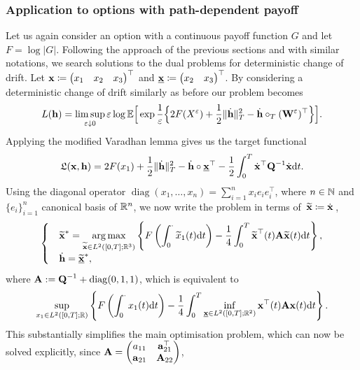 \subsubsection{\textbf{Application to options with path-dependent payoff}}
Let us again consider an option with a continuous payoff function $G$ and let $F=\log|G|$. Following the approach of the previous sections and with similar notations, we search solutions to the dual problems for deterministic change of drift.
Let 
$\boldsymbol{\mathrm{x}} \coloneqq \begin{pmatrix}x_1& x_2& x_3\end{pmatrix}^\top$ and 
$\underline{\boldsymbol{\mathrm{x}}}\coloneqq \begin{pmatrix}x_2 &  x_3\end{pmatrix}^\top$. 
By considering a deterministic change of drift similarly as before our problem becomes 
\[
L(\boldsymbol{\mathrm{h}}) = \limsup\limits_{\varepsilon \downarrow 0} \varepsilon\log\mathbb{E}\Big[\exp\frac{1}{\varepsilon}\Big\{
2F(X^\varepsilon) +\frac{1}{2}\|\dot{\boldsymbol{\mathrm{h}}}\|^2_T - \dot{\boldsymbol{\mathrm{h}}}\circ_{T}({\boldsymbol{\mathrm{W}}^\varepsilon})^\top\Big\}\Big].
\]
Applying the modified Varadhan lemma gives us the 
target functional
$$
\mathfrak{L}(\boldsymbol{\mathrm{x}},\boldsymbol{\mathrm{h}}) = 2F(x_1) + \frac{1}{2}\|\dot{\boldsymbol{\mathrm{h}}}\|^2_T - \dot{\boldsymbol{\mathrm{h}}}\circ\underline{\boldsymbol{\mathrm{x}}}^\top - \frac{1}{2}\int_0^T\dot{\boldsymbol{\mathrm{x}}}^\top \boldsymbol{\mathrm{Q}}^{-1} \dot{\boldsymbol{\mathrm{x}}} \mathrm{d} t.
$$
Using the diagonal operator $\operatorname{diag}(x_1,\dots,x_n)=\sum_{i=1}^n x_i e_i e_i^\top$, where $n\in\mathbb{N}$ and $\{e_i\}_{i=1}^n$ canonical basis of $\mathbb{R}^n$, we now write the problem in terms of~$\widetilde{\boldsymbol{\mathrm{x}}}\coloneqq\dot{\boldsymbol{\mathrm{x}}}\,$,
$$
\begin{cases}
& \displaystyle \widetilde{\boldsymbol{\mathrm{x}}}^{*}  =  \operatorname*{arg\,max}\limits_{\widetilde{\boldsymbol{\mathrm{x}}} \in L^2([0,T]; \mathbb{R}^3)}
\left\{F\left(\int_0^\cdot \widetilde x_1(t) \mathrm{d} t\right) - \frac{1}{4}\int_0^T \widetilde{\boldsymbol{\mathrm{x}}}^\top(t) 
\boldsymbol{\mathrm{A}}\widetilde{\boldsymbol{\mathrm{x}}}(t) \mathrm{d} t\right\}, \\
& \displaystyle \dot{\boldsymbol{\mathrm{h}}} = \widetilde{\underline{\boldsymbol{\mathrm{x}}}}^{*},
\end{cases}
$$
where 
$\boldsymbol{\mathrm{A}} := \boldsymbol{\mathrm{Q}}^{-1} + \operatorname{diag}(0,1,1)$, 
which is equivalent to
\begin{equation}\label{eq:SupInfInt}
\sup\limits_{x_1\in L^2([0,T]; \mathbb{R})}\left \{F\left(\int_0^\cdot x_1(t) \mathrm{d} t\right) - \frac{1}{4}\int_0^T \inf_{\underline{\boldsymbol{\mathrm{x}}}\in L^2([0,T]; \mathbb{R}^2)} \boldsymbol{\mathrm{x}}^\top(t) \boldsymbol{\mathrm{A}}\boldsymbol{\mathrm{x}}(t) \mathrm{d} t \right \}.
\end{equation}
This substantially simplifies the main optimisation problem, which can now be solved explicitly, since 
$
\boldsymbol{\mathrm{A}} =
\begin{pmatrix}
a_{11} & \boldsymbol{\mathrm{a}}_{21}^\top\\
\boldsymbol{\mathrm{a}}_{21} &\boldsymbol{\mathrm{A}}_{22}\\
\end{pmatrix}$,

